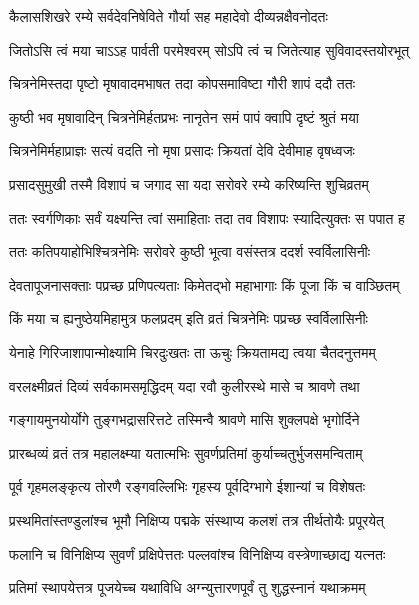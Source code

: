 

\twolineshloka
{कैलासशिखरे रम्ये सर्वदेवनिषेविते}
{गौर्या सह महादेवो दीव्यन्नक्षैवनोदतः}%


\twolineshloka
{जितोऽसि त्वं मया चाऽऽह पार्वती परमेश्वरम्}
{सोऽपि त्वं च जितेत्याह सुविवादस्तयोरभूत्}%


\twolineshloka
{चित्रनेमिस्तदा पृष्टो मृषावादमभाषत}
{तदा कोपसमाविष्टा गौरी शापं ददौ ततः}%


\twolineshloka
{कुष्ठी भव मृषावादिन् चित्रनेमिर्हतप्रभः}
{नानृतेन समं पापं क्वापि दृष्टं श्रुतं मया}%


\twolineshloka
{चित्रनेमिर्महाप्राज्ञः सत्यं वदति नो मृषा}
{प्रसादः क्रियतां देवि देवीमाह वृषध्वजः}%


\twolineshloka
{प्रसादसुमुखी तस्मै विशापं च जगाद सा}
{यदा सरोवरे रम्ये करिष्यन्ति शुचिव्रतम्}%


\twolineshloka
{ततः स्वर्गणिकाः सर्वं यक्ष्यन्ति त्वां समाहिताः}
{तदा तव विशापः स्यादित्युक्तः स पपात ह}%


\twolineshloka
{ततः कतिपयाहोभिश्चित्रनेमिः सरोवरे}
{कुष्ठी भूत्वा वसंस्तत्र ददर्श स्वर्विलासिनीः}%


\twolineshloka
{देवतापूजनासक्ताः पप्रच्छ प्रणिपत्यताः}
{किमेतद्भो महाभागाः किं पूजा किं च वाञ्छितम्}%


\twolineshloka
{किं मया च ह्यनुष्ठेयमिहामुत्र फलप्रदम्}
{इति व्रतं चित्रनेमिः पप्रच्छ स्वर्विलासिनीः}%


\twolineshloka
{येनाहे गिरिजाशापान्मोक्ष्यामि चिरदुःखतः}
{ता ऊचुः क्रियतामद्य त्वया चैतदनुत्तमम्}%


\twolineshloka
{वरलक्ष्मीव्रतं दिव्यं सर्वकामसमृद्धिदम्}
{यदा रवौ कुलीरस्थे मासे च श्रावणे तथा}%


\twolineshloka
{गङ्गायमुनयोर्योगे तुङ्गभद्रासरित्तटे}
{तस्मिन्वै श्रावणे मासि शुक्लपक्षे भृगोर्दिने}%


\twolineshloka
{प्रारब्धव्यं व्रतं तत्र महालक्ष्म्या यतात्मभिः}
{सुवर्णप्रतिमां कुर्याच्चतुर्भुजसमन्विताम्}%


\twolineshloka
{पूर्व गृहमलङ्कृत्य तोरणै रङ्गवल्लिभिः}
{गृहस्य पूर्वदिग्भागे ईशान्यां च विशेषतः}%


\twolineshloka
{प्रस्थमितांस्तण्डुलांश्च भूमौ निक्षिप्य पद्मके}
{संस्थाप्य कलशं तत्र तीर्थतोयैः प्रपूरयेत्}%


\twolineshloka
{फलानि च विनिक्षिप्य सुवर्णं प्रक्षिपेत्ततः}
{पल्लवांश्च विनिक्षिप्य वस्त्रेणाच्छाद्य यत्नतः}%


\twolineshloka
{प्रतिमां स्थापयेत्तत्र पूजयेच्च यथाविधि}
{अग्न्युत्तारणपूर्वं तु शुद्धस्नानं यथाक्रमम्}%


